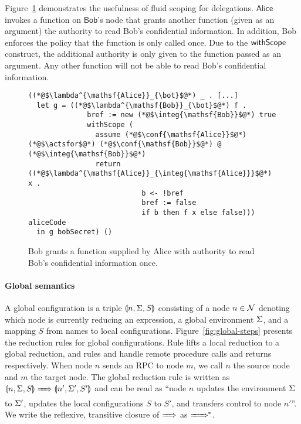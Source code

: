 Figure~\ref{fig:use-case-for-fluid-scope} demonstrates the usefulness of fluid scoping for delegations. $\mathsf{Alice}$ invokes a function on $\mathsf{Bob}$'s node that grants another function (given as an argument) the authority to read Bob's confidential information. In addition, Bob enforces the policy that the function is only called once. Due to the $\mathsf{withScope}$ construct, the additional authority is only given to the function passed as an argument. Any other function will not be able to read Bob's confidential information.

\begin{figure}
\centering
\begin{lstlisting}
((*@$\lambda^{\mathsf{Alice}}_{\bot}$@*) _ . [...]
  let g = ((*@$\lambda^{\mathsf{Bob}}_{\bot}$@*) f .
              bref := new (*@$\integ{\mathsf{Bob}}$@*) true
              withScope (
                assume (*@$\conf{\mathsf{Alice}}$@*) (*@$\actsfor$@*) (*@$\conf{\mathsf{Bob}}$@*) @ (*@$\integ{\mathsf{Bob}}$@*)
                return ((*@$\lambda^{\mathsf{Alice}}_{\integ{\mathsf{Alice}}}$@*) x . 
                           b <- !bref
                           bref := false
                           if b then f x else false))) aliceCode
  in g bobSecret) ()
\end{lstlisting}
\caption{Bob grants a function supplied by Alice with authority to read Bob's confidential information once. }
\label{fig:use-case-for-fluid-scope}
\end{figure}

\paragraph{Global semantics}
A global configuration is a triple $\llparenthesis n, \Sigma, S \rrparenthesis$ consisting of a node $n \in \mathcal{N}$ denoting which node is currently reducing an expression, a global environment $\Sigma$, and a mapping $S$ from names to local configurations. Figure~\ref{fig:global-steps} presents the reduction rules for global configurations. Rule  lifts a local reduction to a global reduction, and rules  and  handle remote procedure calls and returns respectively. When node $n$ sends an RPC to node $m$, we call $n$ the source node and $m$ the target node. The global reduction rule is written as $\gconfig{n}{\env}{S} \gstepsto \gconfig{n'}{\env'}{S'}$ and can be read as ``node $n$ updates the environment $\Sigma$ to $\Sigma'$, updates the local configurations $S$ to $S'$, and transfers control to node $n'$''. We write the reflexive, transitive closure of $\gstepsto$ as $\gstepstos$.

